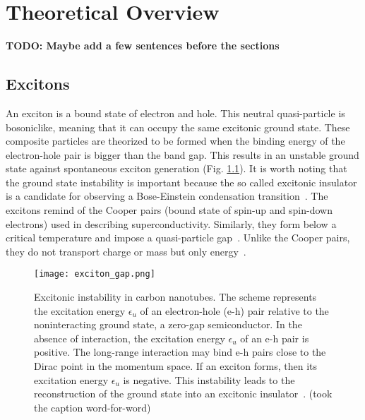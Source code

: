 
\chapter{Theoretical Overview}
\label{sec:theory}
\newcommand{\todo}[1]{\textbf{\color{red}TODO: #1}}

\todo{Maybe add a few sentences before the sections}
\section{Excitons}
An exciton is a bound state of electron and hole. This neutral quasi-particle is bosoniclike, meaning that it can occupy the same excitonic ground state. These composite particles are theorized to be formed when the binding energy of the electron-hole pair is bigger than the band gap. This results in an unstable ground state against spontaneous exciton generation (Fig. \ref{fig:exciton_gap}). It is worth noting that the ground state instability is important because the so called excitonic insulator is a candidate for observing a Bose-Einstein condensation transition~\cite{grossnev}. The excitons remind of the Cooper pairs (bound state of spin-up and spin-down electrons) used in describing superconductivity. Similarly, they form below a critical temperature and impose a quasi-particle gap~\cite{ctubes}. Unlike the Cooper pairs, they do not transport charge or mass but only energy~\cite{grossnev}. 
\begin{figure}[htbp]
    \centerline{\texttt{[image: exciton\_gap.png]}}
    \caption{Excitonic instability in carbon nanotubes. The scheme represents the excitation energy $\epsilon_u$ of an electron-hole (e-h) pair relative to the noninteracting ground state, a zero-gap semiconductor. In the absence of interaction, the excitation energy $\epsilon_u$ of an e-h pair is positive. The long-range interaction may bind e-h pairs close to the Dirac point in the momentum space. If an exciton forms, then its excitation energy $\epsilon_u$ is negative. This instability leads to the reconstruction of the ground state into an excitonic insulator~\cite{ctubes}. (took the caption word-for-word)}
    \label{fig:exciton_gap}
\end{figure}

